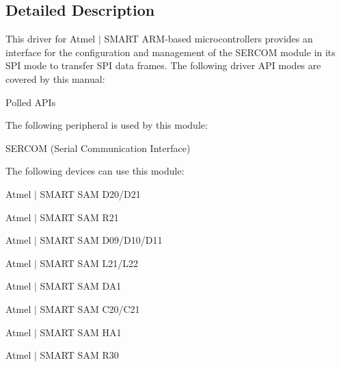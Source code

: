 \subsection{Detailed Description}
This driver for Atmel\textregistered{} $\vert$ S\+M\+A\+RT A\+RM\textregistered{}-\/based microcontrollers provides an interface for the configuration and management of the S\+E\+R\+C\+OM module in its S\+PI mode to transfer S\+PI data frames. The following driver A\+PI modes are covered by this manual\+:


\begin{DoxyItemize}
\item Polled A\+P\+Is
\end{DoxyItemize}

The following peripheral is used by this module\+:
\begin{DoxyItemize}
\item S\+E\+R\+C\+OM (Serial Communication Interface)
\end{DoxyItemize}

The following devices can use this module\+:
\begin{DoxyItemize}
\item Atmel $\vert$ S\+M\+A\+RT S\+AM D20/\+D21
\item Atmel $\vert$ S\+M\+A\+RT S\+AM R21
\item Atmel $\vert$ S\+M\+A\+RT S\+AM D09/\+D10/\+D11
\item Atmel $\vert$ S\+M\+A\+RT S\+AM L21/\+L22
\item Atmel $\vert$ S\+M\+A\+RT S\+AM D\+A1
\item Atmel $\vert$ S\+M\+A\+RT S\+AM C20/\+C21
\item Atmel $\vert$ S\+M\+A\+RT S\+AM H\+A1
\item Atmel $\vert$ S\+M\+A\+RT S\+AM R30
\end{DoxyItemize}

